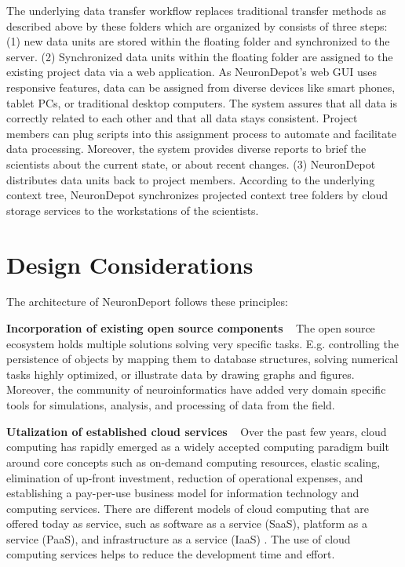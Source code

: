 \documentclass{frontiersSCNS} %
\begin{document}
The underlying data transfer workflow replaces traditional transfer methods as
described above by these folders which are organized by consists of three
steps: (1) new data units are stored within the floating folder and
synchronized to the server. (2) Synchronized data units within the floating
folder are assigned to the existing project data via a web application. As
NeuronDepot's web GUI uses responsive features, data can be assigned from
diverse devices like smart phones, tablet PCs, or traditional desktop
computers. The system assures that all data is correctly related to each other
and that all data stays consistent. Project members can plug scripts into this
assignment process to automate and facilitate data processing. Moreover, the
system provides diverse reports to brief the scientists about the current
state, or about recent changes. (3) NeuronDepot distributes data units back to
project members. According to the underlying context tree, NeuronDepot
synchronizes projected context tree folders by cloud storage services to the
workstations of the scientists.


\section{Design Considerations}
The architecture of NeuronDeport follows these principles:

\textbf{Incorporation of existing open source components} \texttt{  } The open source ecosystem holds multiple solutions solving very specific tasks.
E.g. controlling the persistence of objects by mapping them to database
structures, solving numerical tasks highly optimized, or illustrate data by
drawing graphs and figures. Moreover, the community of neuroinformatics have
added  very domain specific tools for simulations, analysis, and processing of
data from the field.

\textbf{Utalization of established cloud services} \texttt{  } Over the past
few years, cloud computing has rapidly emerged as a widely accepted computing
paradigm built around core concepts such as on-demand computing resources,
elastic scaling, elimination of up-front investment, reduction of operational
expenses, and establishing a pay-per-use business model for information
technology and computing services. There are different models of cloud
computing that are offered today as service, such as software as a service
(SaaS), platform as a service (PaaS), and infrastructure as a service (IaaS)
\citep{Mell2011, Azodolmolky2013}. The use of cloud computing services helps to
reduce the development time and effort.
\end{document}
